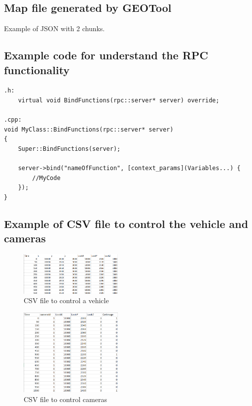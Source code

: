 \documentclass[10pt,a4paper,twocolumn,twoside]{article}
\begin{document}
\subsection{Map file generated by GEOTool}
\label{appendix:mapjson}

Example of JSON with 2 chunks.


\subsection{Example code for understand the RPC functionality}
\label{appendix:extendrpc}

\lstset{language=C} 
\begin{lstlisting}
.h:
	virtual void BindFunctions(rpc::server* server) override;
	
.cpp:
void MyClass::BindFunctions(rpc::server* server)
{
	Super::BindFunctions(server);

	server->bind("nameOfFunction", [context_params](Variables...) {
		//MyCode
	});
}

\end{lstlisting}

\subsection{Example of CSV file to control the vehicle and cameras}
\label{appendix:fitxerscsv}

\begin{figure}[!h]
\centering
  	\includegraphics[width=0.45\textwidth]{fitxervehicle}
	\captionsetup{labelformat=empty}
	\caption{CSV file to control a vehicle}
	\label{fig-fitxervehicle}
\end{figure}


\begin{figure}[!h]
\centering
  	\includegraphics[width=0.45\textwidth]{fitxercameres}
  	\captionsetup{labelformat=empty}
	\caption{CSV file to control cameras}
	\label{fig-fitxercameres}
\end{figure}
\end{document}
